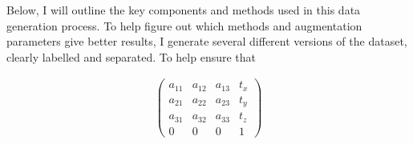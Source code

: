 Below, I will outline the key components and methods used in this data generation process. To help figure out which methods and augmentation parameters give better results, I generate several different versions of the dataset, clearly labelled and separated. To help ensure that

\begin{align*}
  \begin{pmatrix}
    a_{11} & a_{12} & a_{13} & t_x \\
    a_{21} & a_{22} & a_{23} & t_y \\
    a_{31} & a_{32} & a_{33} & t_z \\
    0 & 0 & 0 & 1
  \end{pmatrix}
\end{align*}
